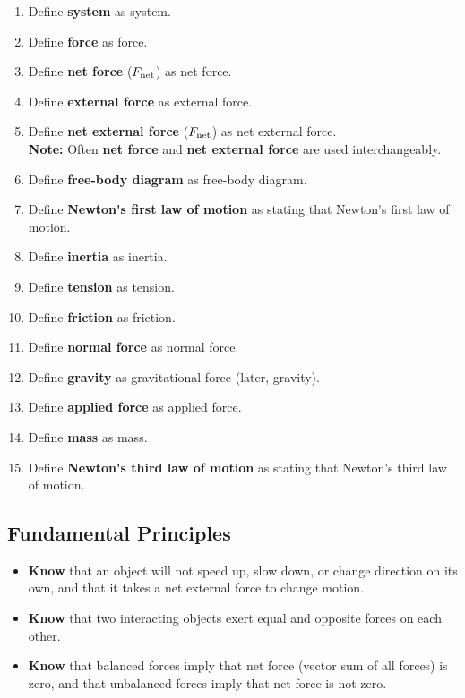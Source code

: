 \documentclass[dvipsnames]{article}
\begin{document}
\begin{enumerate}[itemsep=0pt]
    \item Define \textbf{\gls{system}} as \glsdesc{system}.
    \item Define \textbf{\gls{force}} as \glsdesc{force}.
    \item Define \textbf{\gls{net force}} ($F_\text{\scriptsize net}$) as \glsdesc{net force}.
    \item Define \textbf{\gls{external force}} as \glsdesc{external force}.
    \item Define \textbf{\gls{net external force}} ($F_\text{\scriptsize net}$) as \glsdesc{net external force}.\\ \textbf{Note:} Often \textbf{net force} and \textbf{net external force} are used interchangeably.
    \item Define \textbf{\gls{free-body diagram}} as \glsdesc{free-body diagram}.
    \item Define \textbf{\gls{Newton's first law of motion}} as stating that \glsdesc{Newton's first law of motion}.
    \item Define \textbf{\gls{inertia}} as \glsdesc{inertia}.
    \item Define \textbf{\gls{tension}} as \glsdesc{tension}.
    \item Define \textbf{\gls{friction}} as \glsdesc{friction}.
    \item Define \textbf{\gls{normal force}} as \glsdesc{normal force}.
    \item Define \textbf{\gls{gravity}} as \glsdesc{gravitational force} (later, \glsdesc{gravity}).
    \item Define \textbf{\gls{applied force}} as \glsdesc{applied force}.
    \item Define \textbf{\gls{mass}} as \glsdesc{mass}.
    \item Define \textbf{\gls{Newton's third law of motion}} as stating that \glsdesc{Newton's third law of motion}.
\end{enumerate}

\subsection*{Fundamental Principles}

\begin{itemize}[itemsep=0pt,topsep=-3pt]
    \item \textbf{Know} that an object will not speed up, slow down, or change direction on its own, and that it takes a net external force to change motion.
    \item \textbf{Know} that two interacting objects exert equal and opposite forces on each other.
    \item \textbf{Know} that balanced forces imply that net force (vector sum of all forces) is zero, and that unbalanced forces imply that net force is not zero.
\end{itemize}
\end{document}
